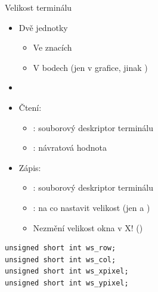 \begin{frame}[fragile]{Velikost terminálu}

  \begin{itemize}
    \item Dvě jednotky
    \begin{itemize}
      \item Ve znacích
      \item V bodech (jen v grafice, jinak )
    \end{itemize}

    \pause

    \item {}
    \item Čtení: 
    \begin{itemize}
      \item {}: souborový deskriptor terminálu
      \item {}: návratová hodnota
    \end{itemize}

    \pause

    \item Zápis: 
    \begin{itemize}
      \item {}: souborový deskriptor terminálu
      \item {}: na co nastavit velikost (jen  a
        )
      \item Nezmění velikost okna v X! () %
    \end{itemize}

  \end{itemize}

  \begin{block}{}
  \begin{lstlisting}
unsigned short int ws_row;
unsigned short int ws_col;
unsigned short int ws_xpixel;
unsigned short int ws_ypixel;
  \end{lstlisting}
  \end{block}
\end{frame}

